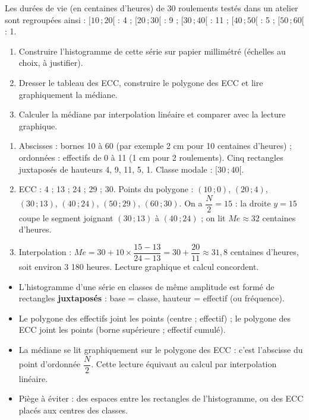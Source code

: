 \documentclass[11pt]{article}
\newcommand{\cle}[1]{{\popxbold\color{popdark}#1}}
\begin{document}
\begin{exercice}
Les durées de vie (en centaines d'heures) de 30 roulements testés dans un atelier sont regroupées ainsi : $[10\,;20[$ : 4 ; $[20\,;30[$ : 9 ; $[30\,;40[$ : 11 ; $[40\,;50[$ : 5 ; $[50\,;60[$ : 1.
\begin{enumerate}
\item Construire l'histogramme de cette série sur papier millimétré (échelles au choix, à justifier).
\item Dresser le tableau des ECC, construire le polygone des ECC et lire graphiquement la médiane.
\item Calculer la médiane par interpolation linéaire et comparer avec la lecture graphique.
\end{enumerate}
\end{exercice}

\begin{corrige}
\begin{enumerate}
\item Abscisses : bornes 10 à 60 (par exemple 2 cm pour 10 centaines d'heures) ; ordonnées : effectifs de 0 à 11 (1 cm pour 2 roulements). Cinq rectangles juxtaposés de hauteurs 4, 9, 11, 5, 1. Classe modale : $[30\,;40[$.
\item ECC : 4 ; 13 ; 24 ; 29 ; 30. Points du polygone : $(10\,;0)$, $(20\,;4)$, $(30\,;13)$, $(40\,;24)$, $(50\,;29)$, $(60\,;30)$. On a $\dfrac{N}{2} = 15$ : la droite $y = 15$ coupe le segment joignant $(30\,;13)$ à $(40\,;24)$ ; on lit $Me \approx 32$ centaines d'heures.
\item Interpolation : $Me = 30 + 10 \times \dfrac{15 - 13}{24 - 13} = 30 + \dfrac{20}{11} \approx 31{,}8$ centaines d'heures, soit environ 3 180 heures. Lecture graphique et calcul concordent.
\end{enumerate}
\end{corrige}

\begin{aretenir}
\begin{itemize}
\item L'\cle{histogramme} d'une série en classes de même amplitude est formé de rectangles \textbf{juxtaposés} : base = classe, hauteur = effectif (ou fréquence).
\item Le \cle{polygone des effectifs} joint les points (centre ; effectif) ; le \cle{polygone des ECC} joint les points (borne supérieure ; effectif cumulé).
\item La \cle{médiane} se lit graphiquement sur le polygone des ECC : c'est l'abscisse du point d'ordonnée $\dfrac{N}{2}$. Cette lecture équivaut au calcul par interpolation linéaire.
\item Piège à éviter : des espaces entre les rectangles de l'histogramme, ou des ECC placés aux centres des classes.
\end{itemize}
\end{aretenir}
\end{document}
